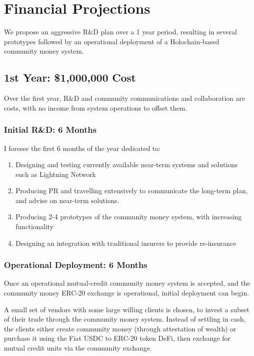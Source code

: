 \documentclass[11pt]{article}
\begin{document}
\section{Financial Projections}
\label{sec:orgf2130c0}

We propose an aggressive R\&D plan over a 1 year period, resulting in several prototypes followed
by an operational deployment of a Holochain-based community money system.

\subsection{1st Year: \$1,000,000 Cost}
\label{sec:orgeef3426}

Over the first year, R\&D and community communications and collaboration are costs, with no income
from system operations to offset them.

\subsubsection{Initial R\&D: 6 Months}
\label{sec:org3c474db}

I foresee the first 6 months of the year dedicated to:

\begin{enumerate}
\item Designing and testing currently available near-term systems and solutions such as Lightning Network
\item Producing PR and travelling extensively to communicate the long-term plan, and advise on near-term solutions.
\item Producing 2-4 prototypes of the community money system, with increasing functionality
\item Designing an integration with traditional insurers to provide re-insurance
\end{enumerate}

\subsubsection{Operational Deployment: 6 Months}
\label{sec:org3a65231}

Once an operational mutual-credit community money system is accepted, and the community money
ERC-20 exchange is operational, initial deployment can begin.

A small set of vendors with some large willing clients is chosen, to invest a subset of their
trade through the community money system.  Instead of settling in cash, the clients either
create community money (through attestation of wealth) or purchase it using the Fiat USDC to
ERC-20 token DeFi, then exchange for mutual credit units via the community exchange.
\end{document}
